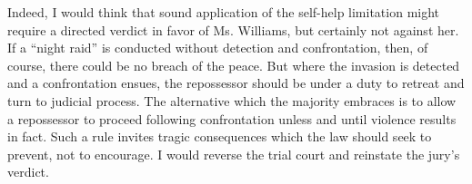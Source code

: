 Indeed, I would think that sound application of the self-help limitation might
require a directed verdict in favor of Ms. Williams, but certainly not against
her. If a ``night raid'' is conducted without detection and confrontation,
then, of course, there could be no breach of the peace. But where the invasion
is detected and a confrontation ensues, the repossessor should be under a duty
to retreat and turn to judicial process. The alternative which the majority
embraces is to allow a repossessor to proceed following confrontation unless
and until violence results in fact. Such a rule invites tragic consequences
which the law should seek to prevent, not to encourage. I would reverse the
trial court and reinstate the jury's verdict.

